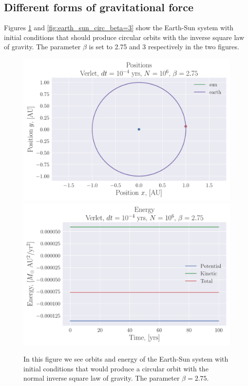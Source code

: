 \documentclass[reprint, english,notitlepage,nofootinbib]{revtex4-1}  %
\begin{document}
\subsection{Different forms of gravitational force}

Figures \ref{fig:earth_sun_circ_beta=2_75} and \ref{fig:earth_sun_circ_beta=3} show the Earth-Sun system with initial conditions that should produce circular orbits with the inverse square law of gravity. The parameter $\beta$ is set to 2.75 and 3 respectively in the two figures.

\begin{figure}[h]
	\centering
	\includegraphics[width=\linewidth]{../output/earth_sun_circ-verlet-4-6-2_75.pdf}
  \includegraphics[width=\linewidth]{../output/earth_sun_circ-verlet-4-6-2_75_energy.pdf}
	\caption{In this figure we see orbits and energy of the Earth-Sun system with initial conditions that would produce a circular orbit with the normal inverse square law of gravity. The parameter $\beta = 2.75$.}
	\label{fig:earth_sun_circ_beta=2_75}
\end{figure}
\end{document}
